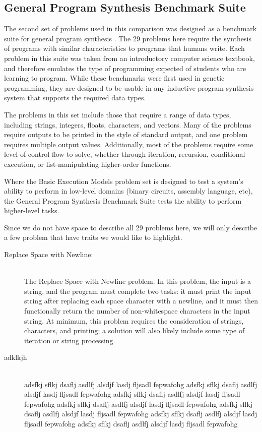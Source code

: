 \subsection{General Program Synthesis Benchmark Suite}
The second set of problems used in this comparison was designed as a benchmark suite for general program synthesis \cite{Helmuth2015b}. The 29 problems here require the synthesis of programs with similar characteristics to programs that humans write. Each problem in this suite was taken from an introductory computer science textbook, and therefore emulates the type of programming expected of students who are learning to program. While these benchmarks were first used in genetic programming, they are designed to be usable in any inductive program synthesis system that supports the required data types.

The problems in this set include those that require a range of data types, including strings, integers, floats, characters, and vectors. Many of the problems require outputs to be printed in the style of standard output, and one problem requires multiple output values. Additionally, most of the problems require some level of control flow to solve, whether through iteration, recursion, conditional execution, or list-manipulating higher-order functions.

Where the Basic Execution Models problem set is designed to test a system's ability to perform in low-level domains (binary circuits, assembly language, etc), the General Program Synthesis Benchmark Suite tests the ability to perform higher-level tasks.

Since we do not have space to describe all 29 problems here, we will only describe a few problem that have traits we would like to highlight.

\begin{description}

\item[Replace Space with Newline:]  \ \\
The Replace Space with Newline problem. In this problem, the input is a string, and the program must complete two tasks: it must print the input string after replacing each space character with a newline, and it must then functionally return the number of non-whitespace characters in the input string. At minimum, this problem requires the consideration of strings, characters, and printing; a solution will also likely include some type of iteration or string processing. 

\item[adklkjh] \ \\
adsfkj sflkj dsaflj asdlfj alsdjf lasdj fljsadl fepwafohg adsfkj sflkj dsaflj asdlfj alsdjf lasdj fljsadl fepwafohg adsfkj sflkj dsaflj asdlfj alsdjf lasdj fljsadl fepwafohg adsfkj sflkj dsaflj asdlfj alsdjf lasdj fljsadl fepwafohg adsfkj sflkj dsaflj asdlfj alsdjf lasdj fljsadl fepwafohg adsfkj sflkj dsaflj asdlfj alsdjf lasdj fljsadl fepwafohg adsfkj sflkj dsaflj asdlfj alsdjf lasdj fljsadl fepwafohg
\end{description}

